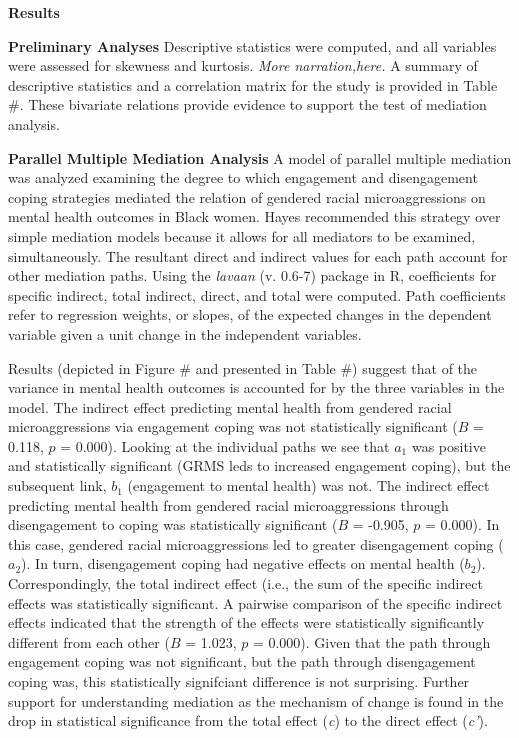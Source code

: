 \documentclass[
  11pt,
]{book}
\begin{document}
\textbf{Results}

\textbf{Preliminary Analyses} Descriptive statistics were computed, and all variables were assessed for skewness and kurtosis. \emph{More narration,here.} A summary of descriptive statistics and a correlation matrix for the study is provided in Table \#. These bivariate relations provide evidence to support the test of mediation analysis.

\textbf{Parallel Multiple Mediation Analysis} A model of parallel multiple mediation was analyzed examining the degree to which engagement and disengagement coping strategies mediated the relation of gendered racial microaggressions on mental health outcomes in Black women. Hayes \citeyearpar{hayes_introduction_2018} recommended this strategy over simple mediation models because it allows for all mediators to be examined, simultaneously. The resultant direct and indirect values for each path account for other mediation paths. Using the \emph{lavaan} (v. 0.6-7) package in R, coefficients for specific indirect, total indirect, direct, and total were computed. Path coefficients refer to regression weights, or slopes, of the expected changes in the dependent variable given a unit change in the independent variables.

Results (depicted in Figure \# and presented in Table \#) suggest that of the variance in mental health outcomes is accounted for by the three variables in the model. The indirect effect predicting mental health from gendered racial microaggressions via engagement coping was not statistically significant (\(B\) = 0.118, \(p\) = 0.000). Looking at the individual paths we see that \(a_{1}\) was positive and statistically significant (GRMS leds to increased engagement coping), but the subsequent link, \(b_{1}\) (engagement to mental health) was not. The indirect effect predicting mental health from gendered racial microaggressions through disengagement to coping was statistically significant (\(B\) = -0.905, \(p\) = 0.000). In this case, gendered racial microaggressions led to greater disengagement coping (\(a_{2}\)). In turn, disengagement coping had negative effects on mental health (\(b_{2}\)). Correspondingly, the total indirect effect (i.e., the sum of the specific indirect effects was statistically significant. A pairwise comparison of the specific indirect effects indicated that the strength of the effects were statistically significantly different from each other (\(B\) = 1.023, \(p\) = 0.000). Given that the path through engagement coping was not significant, but the path through disengagement coping was, this statistically signifciant difference is not surprising. Further support for understanding mediation as the mechanism of change is found in the drop in statistical significance from the total effect (\emph{c}) to the direct effect (\emph{c'}).
\end{document}
